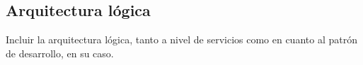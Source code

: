 \subsection{\forlnameref Arquitectura lógica}
\label{sec:logicalArchitecture}

\begin{shaded}
Incluir la arquitectura lógica, tanto a nivel de servicios como en cuanto al patrón de desarrollo, en su caso.
\end{shaded}
